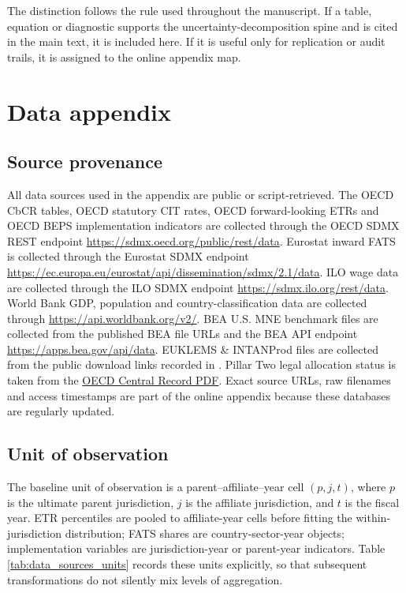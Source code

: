\documentclass[11pt,a4paper]{article}
\begin{document}
The distinction follows the rule used throughout the manuscript. If a table, equation or diagnostic supports the uncertainty-decomposition spine and is cited in the main text, it is included here. If it is useful only for replication or audit trails, it is assigned to the online appendix map.

\section{Data appendix}\label{app:data}

\subsection{Source provenance}\label{app:source_provenance}

All data sources used in the appendix are public or script-retrieved. The OECD CbCR tables, OECD statutory CIT rates, OECD forward-looking ETRs and OECD BEPS implementation indicators are collected through the OECD SDMX REST endpoint \url{https://sdmx.oecd.org/public/rest/data}. Eurostat inward FATS is collected through the Eurostat SDMX endpoint \url{https://ec.europa.eu/eurostat/api/dissemination/sdmx/2.1/data}. ILO wage data are collected through the ILO SDMX endpoint \url{https://sdmx.ilo.org/rest/data}. World Bank GDP, population and country-classification data are collected through \url{https://api.worldbank.org/v2/}. BEA U.S. MNE benchmark files are collected from the published BEA file URLs and the BEA API endpoint \url{https://apps.bea.gov/api/data}. EUKLEMS \& INTANProd files are collected from the public download links recorded in . Pillar Two legal allocation status is taken from the \href{https://www.oecd.org/content/dam/oecd/en/topics/policy-sub-issues/global-minimum-tax/administrative-guidance-globe-rules-pillar-two-central-record-legislation-transitional-qualified-status.pdf}{OECD Central Record PDF}. Exact source URLs, raw filenames and access timestamps are part of the online appendix because these databases are regularly updated.

\subsection{Unit of observation}\label{app:unit_obs}

The baseline unit of observation is a parent--affiliate--year cell $(p,j,t)$, where $p$ is the ultimate parent jurisdiction, $j$ is the affiliate jurisdiction, and $t$ is the fiscal year. ETR percentiles are pooled to affiliate-year cells before fitting the within-jurisdiction distribution; FATS shares are country-sector-year objects; implementation variables are jurisdiction-year or parent-year indicators. Table \ref{tab:data_sources_units} records these units explicitly, so that subsequent transformations do not silently mix levels of aggregation.
\end{document}
